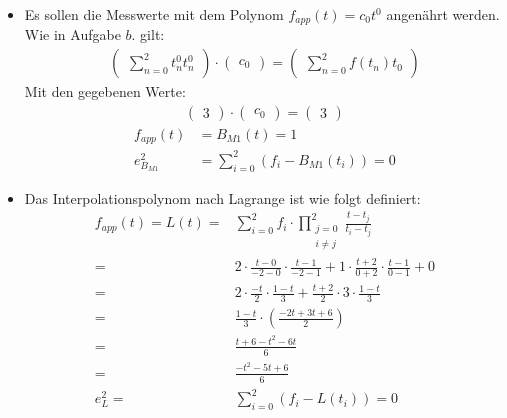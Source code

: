 \begin{itemize}
\begin{align*}
\begin{matrix}
				1	&	0 \\ 0 	& 1\end{matrix}\ \ \right|\ \begin{matrix} \frac{11}{14}\\\frac{-9}{14}
			\end{matrix}\right)\quad\quad\text{nach Gauß-Verfahren}
		\end{align*}
		\begin{align*}
			f_{app}(t) = B_{M2}(t)	=& \frac{11}{14}-\frac{9}{14}t\\
			e_{B_{M2}}^2			=& \sum_{i=0}^2\left( f_i - B_{M2}(t_i) \right) = -\frac{13}{14}
		\end{align*}
		\item[c.] Es sollen die Messwerte mit dem Polynom $f_{app}(t) = c_0t^0$ angenährt werden. Wie in Aufgabe $b.$ gilt:
		\begin{align*}
			\left(\begin{matrix} \sum_{n=0}^2 t_n^0t_n^0\end{matrix}\right) \cdot \left(\begin{matrix} c_0 \end{matrix}\right) = \left(\begin{matrix} \sum_{n=0}^2f(t_n)t_0\end{matrix}\right)
		\end{align*}
		Mit den gegebenen Werte:
		\begin{align*}
			\left(\begin{matrix} 3\end{matrix}\right) \cdot \left(\begin{matrix} c_0 \end{matrix}\right) = \left(\begin{matrix} 3\end{matrix}\right)
		\end{align*}
		\begin{align*}
			f_{app}(t)		&= B_{M1}(t) = 1\\
			e_{B_{M1}}^2	&= \sum_{i=0}^2\left( f_i - B_{M1}(t_i) \right) = 0
		\end{align*}
		\item[d.] Das Interpolationspolynom nach Lagrange ist wie folgt definiert:
		\begin{align*}
			f_{app}(t) = L(t)	=& \sum_{i=0}^2 f_i\cdot \prod_{\substack{j=0\\i\ne j}}^2\frac{t - t_j}{t_i-t_j}\\
								=& 2\cdot\frac{t-0}{-2-0}\cdot\frac{t-1}{-2-1} + 1\cdot \frac{t+2}{0+2}\cdot\frac{t-1}{0-1} + 0\\
								=& 2\cdot\frac{-t}{2}\cdot\frac{1-t}{3} + \frac{t+2}{2}\cdot3\cdot\frac{1-t}{3}\\
								=& \frac{1-t}{3}\cdot\left(\frac{-2t+3t+6}{2}\right)\\
								=& \frac{t+6-t^2-6t}{6}\\
								=& \frac{-t^2-5t+6}{6}\\
						e_L^2	=& \sum_{i=0}^2\left( f_i - L(t_i) \right)= 0
		\end{align*}


	\end{itemize}
